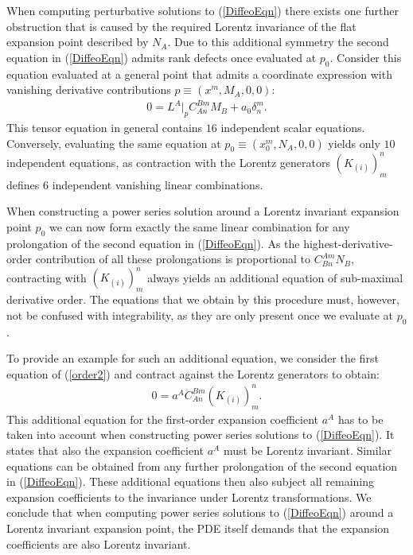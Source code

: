 \documentclass[%
preprint,
titlepage,
nofootinbib,
amsmath,amssymb,
showkeys,
aps,
prd,
floatfix,
]{revtex4-2}
\begin{document}
When computing perturbative solutions to (\ref{DiffeoEqn})  there exists one further obstruction that is caused by the required Lorentz invariance of the flat expansion point described by $N_A$. Due to this additional symmetry the second equation in (\ref{DiffeoEqn}) admits rank defects once evaluated at $p_0$. Consider this equation evaluated at a general point that admits a coordinate expression with vanishing derivative contributions $p \equiv (x^m,M_A,0,0)$:
\begin{align}
0 = L^A \big \vert_{p} C_{An}^{Bm}M_B + a_0 \delta^m_n.
\end{align}
This tensor equation in general contains $16$ independent scalar equations. Conversely, evaluating the same equation at $p_0\equiv (x_0^m, N_A,0,0)$ yields only $10$ independent equations, as contraction with the Lorentz generators $(K_{(i)})^n_m$ defines $6$ independent vanishing linear combinations.

When constructing a power series solution around a Lorentz invariant expansion point $p_0$ we can now form exactly the same linear combination for any prolongation of the second equation in (\ref{DiffeoEqn}). As the highest-derivative-order contribution of all these prolongations is proportional to $C^{Am}_{Bn}N_B$, contracting with $(K_{(i)})^n_m$ always yields an additional equation of sub-maximal derivative order. The equations that we obtain by this procedure must, however, not be confused with integrability, as they are only present once we evaluate at $p_0$. 

To provide an example for such an additional equation, we consider the first equation of (\ref{order2}) and contract against the Lorentz generators to obtain:
\begin{align}\label{ansatz1}
    0 = a^A C^{Bm}_{An}  (K_{(i)})^n_m.
\end{align}
This additional equation for the first-order expansion coefficient $a^A$ has to be taken into account when constructing power series solutions to (\ref{DiffeoEqn}).
It states that also the expansion coefficient $a^A$ must be Lorentz invariant. 
Similar equations can be obtained from any further prolongation of the second equation in (\ref{DiffeoEqn}). These additional equations then also subject all remaining expansion coefficients to the invariance under Lorentz transformations.
We conclude that when computing power series solutions to (\ref{DiffeoEqn}) around a Lorentz invariant expansion point, the PDE itself demands that the expansion coefficients are also Lorentz invariant.
\end{document}
